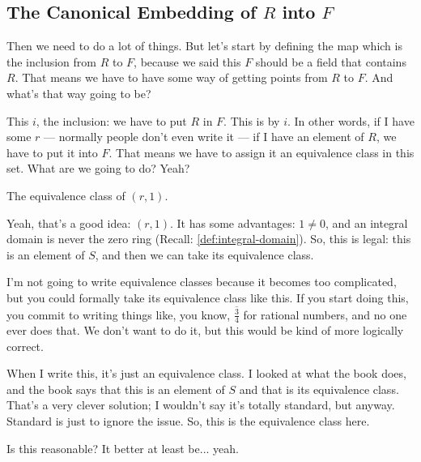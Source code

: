 \subsection{The Canonical Embedding of \texorpdfstring{$R$}{R} into \texorpdfstring{$F$}{F}}

\begin{speech}[00:51:50 - 00:52:36]
Then we need to do a lot of things. But let's start by defining the map which is the inclusion from $R$ to $F$,  because we said this $F$ should be a field that contains $R$. That means we have to have some way of getting points from $R$ to $F$. And what's that way going to be?

This $i$, the inclusion: we have to put $R$ in $F$.  This is by $i$. In other words, if I have some $r$ --- normally people don't even write it --- if I have an element of $R$, we have to put it into $F$.  That means we have to assign it an equivalence class in this set. What are we going to do? Yeah?
\end{speech}

\begin{student}
The equivalence class of $(r, 1)$.
\end{student}

\begin{speech}[00:52:38 - 00:53:15]
Yeah, that's a good idea: $(r, 1)$.  It has some advantages: $1 \neq 0$, and an integral domain is never the zero ring (Recall: \cref{def:integral-domain}). So, this is legal: this is an element of $S$,  and then we can take its equivalence class.

I'm not going to write equivalence classes because it becomes too complicated, but you could formally take its equivalence class like this. If you start doing this, you commit to writing things like, you know, $\overline{\frac{3}{4}}$  for rational numbers, and no one ever does that. We don't want to do it, but this would be kind of more logically correct.
\end{speech}

\begin{speech}[00:53:15 - 00:53:42]
When I write this, it's just an equivalence class. I looked at what the book does, and the book says that this is an element of $S$ and that is its equivalence class.  That's a very clever solution; I wouldn't say it's totally standard, but anyway. Standard is just to ignore the issue.  So, this is the equivalence class here. 

Is this reasonable? It better at least be... yeah.
\end{speech}

